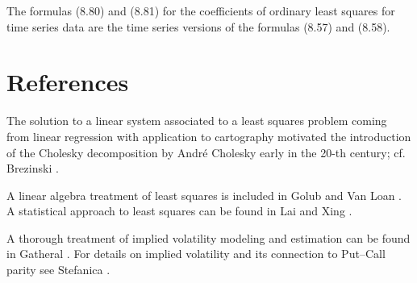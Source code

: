 The formulas (8.80) and (8.81) for the coefficients of ordinary least squares for time
series data are the time series versions of the formulas (8.57) and (8.58).

\section{References}

The solution to a linear system associated to a least squares problem coming from
linear regression with application to cartography motivated the introduction of the
Cholesky decomposition by Andr\'e Cholesky early in the 20-th century; cf. Brezinski
\cite{9}.

A linear algebra treatment of least squares is included in Golub and Van Loan
\cite{18}. A statistical approach to least squares can be found in Lai and Xing
\cite{25}.

A thorough treatment of implied volatility modeling and estimation can be found in
Gatheral \cite{15}. For details on implied volatility and its connection to Put--Call
parity see Stefanica \cite{36}.
